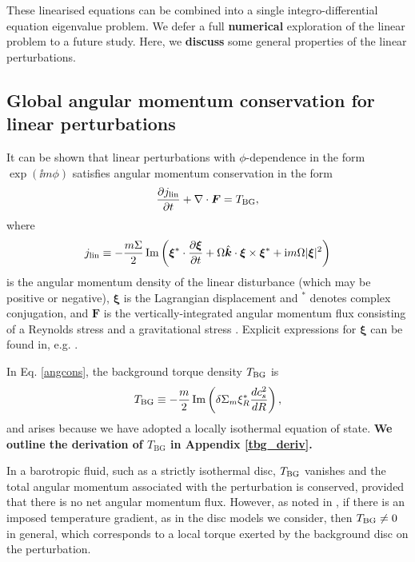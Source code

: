 These linearised equations can be combined into a single
integro-differential equation eigenvalue problem. We defer a full
{\bf numerical} exploration of the linear problem to a future study. Here, we {\bf
  discuss} some
general properties of the linear perturbations. %

\subsection{Global angular momentum conservation for linear
  perturbations} \label{global_cons}
It can be shown that linear perturbations with $\phi$-dependence in the form
$\exp{(\ii m\phi)}$ satisfies angular momentum conservation
in the form 
\begin{align}\label{angcons}
  \frac{\partial j_\mathrm{lin}}{\partial t} + \nabla\cdot\bm{F} = T_\mathrm{BG}, 
\end{align}
\citep[e.g.][]{narayan87,ryu92,lin93b} where
\begin{align}\label{lin_ang_mom_cons}
  j_\mathrm{lin} \equiv
  -\frac{m\Sigma}{2}\operatorname{Im}\left(\bm{\xi}^*\cdot\frac{\partial\bm{\xi}}{\partial
      t} + \Omega \hat{\bm{k}}\cdot\bm{\xi}\times\bm{\xi}^* + \mathrm{i}
    m \Omega |\bm{\xi}|^2\right) 
\end{align}
is the angular momentum density of the linear disturbance (which may
be positive or negative), $\bm{\xi}$ is the Lagrangian
displacement and $^*$ denotes complex conjugation, and $\bm{F}$ is the
vertically-integrated angular momentum flux consisting of a Reynolds
stress and a gravitational stress \citep{lin11b}. Explicit expressions
for $\bm{\xi}$ can be found in, e.g. \cite{papaloizou85}. 

In Eq. \ref{angcons}, the background torque density $T_\mathrm{BG}$ is 
\begin{align}\label{baroclinic_torque}
  T_\mathrm{BG} \equiv
  -\frac{m}{2}\operatorname{Im}\left(\delta\Sigma_m\xi_R^*\frac{dc_s^2}{dR}\right), 
\end{align}
and arises because we have adopted a locally isothermal equation of
state. {\bf  We outline the
derivation of $T_\mathrm{BG}$ in Appendix \ref{tbg_deriv}.} 

In a barotropic fluid, such as a strictly isothermal disc,
$T_\mathrm{BG}$ vanishes and the total angular momentum associated with
the perturbation is conserved, provided that there is no net angular
momentum flux. However, as noted in \cite{lin11b}, if there is an imposed
temperature gradient, as in the disc models we consider,
then $T_\mathrm{BG}\neq 0$ in general, which corresponds to a local torque
exerted by the background disc on the perturbation. 

